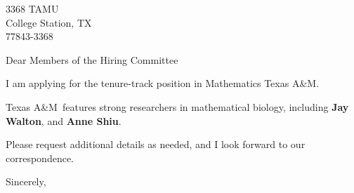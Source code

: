 




	
	
	\def\School{Texas A\&M}
	
	\begin{letter}
		{3368 TAMU\\
			College Station, TX\\
			77843-3368
			
		}
		
		\opening{Dear Members of the Hiring Committee}
		
		
		I am applying for the tenure-track position in Mathematics \School. 
		
		
		
		\School~features strong researchers in mathematical biology, including \textbf{Jay Walton}, and \textbf{Anne Shiu}. 
		
		
		
		
		
		Please request additional details as needed, and I look forward to our correspondence.
		
		\closing{Sincerely,}
	\end{letter}
